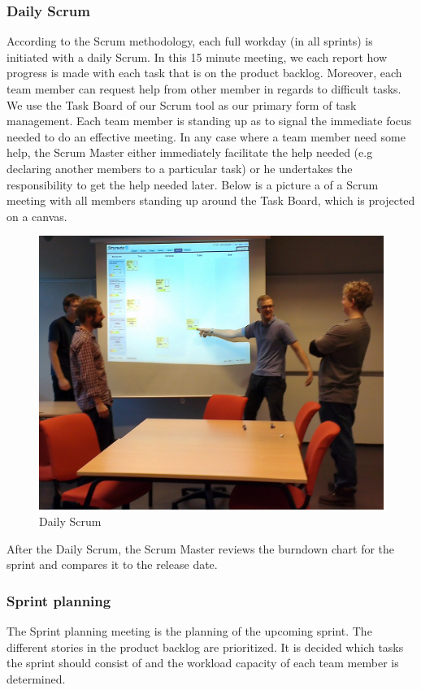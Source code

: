 \subsubsection{Daily Scrum}
According to the Scrum methodology, each full workday (in all sprints) is initiated with a daily Scrum. In this 15 minute meeting, we each report how progress is made with each task that is on the product backlog. Moreover, each team member can request help from other member in regards to difficult tasks. We use the Task Board of our Scrum tool as our primary form of task management. Each team member is standing up as to signal the immediate focus needed to do an effective meeting. In any case where a team member need some help, the Scrum Master either immediately facilitate the help needed (e.g declaring another members to a particular task) or he undertakes the responsibility to get the help needed later. Below is a picture a of a Scrum meeting with all members standing up around the Task Board, which is projected on a canvas.
\begin{figure}[H]
  \includegraphics[width=\textwidth,natwidth=1696,natheight=1349]{illustrations/Daily.jpg}
  \caption{Daily Scrum}
  \label{dailyscrum}
\end{figure}
After the Daily Scrum, the Scrum Master reviews the burndown chart for the sprint and compares it to the release date. 
\subsubsection{Sprint planning}
The Sprint planning meeting is the planning of the upcoming sprint. The different stories in the product backlog are prioritized. It is decided which tasks the sprint should consist of and the workload capacity of each team member is determined.
